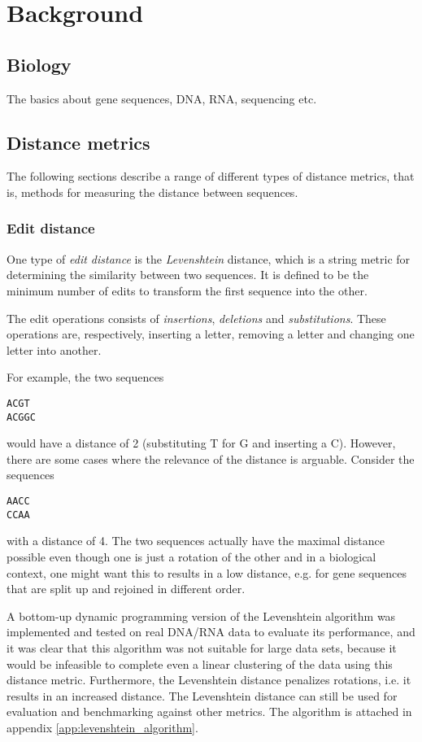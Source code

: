 \section{Background}

\subsection{Biology}
The basics about gene sequences, DNA, RNA, sequencing etc. %

\subsection{Distance metrics}
The following sections describe a range of different types of distance metrics,
that is, methods for measuring the distance between sequences.

\subsubsection{Edit distance}
One type of \emph{edit distance} is the \emph{Levenshtein} distance, which is a
string metric for determining the similarity between two sequences. It is
defined to be the minimum number of edits to transform the first sequence into
the other.~\cite[p.~52]{dong}

The edit operations consists of \emph{insertions}, \emph{deletions} and
\emph{substitutions}. These operations are, respectively, inserting a letter,
removing a letter and changing one letter into another.

For example, the two sequences
\begin{center}
  \texttt{ACGT} \\
  \texttt{ACGGC}
\end{center}
would have a distance of 2 (substituting T for G and inserting a C). However,
there are some cases where the relevance of the distance is arguable. Consider
the sequences
\begin{center}
  \texttt{AACC} \\
  \texttt{CCAA}
\end{center}
with a distance of 4. The two sequences actually have the maximal distance
possible even though one is just a rotation of the other and in a biological
context, one might want this to results in a low distance, e.g. for gene
sequences that are split up and rejoined in different order.

A bottom-up dynamic programming version of the Levenshtein algorithm was
implemented and tested on real DNA/RNA data to evaluate its performance, and it
was clear that this algorithm was not suitable for large data sets, because it
would be infeasible to complete even a linear clustering of the data using this
distance metric.  Furthermore, the Levenshtein distance penalizes rotations,
i.e. it results in an increased distance. The Levenshtein distance can still be
used for evaluation and benchmarking against other metrics. The algorithm is
attached in appendix \ref{app:levenshtein_algorithm}.

